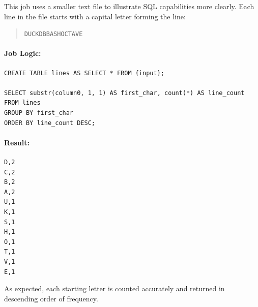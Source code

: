 This job uses a smaller text file to illustrate SQL capabilities more clearly. Each line in the file starts with a capital letter forming the line:

\begin{quote}
\texttt{DUCKDBBASHOCTAVE}
\end{quote}

\paragraph{Job Logic:}
\begin{verbatim}
CREATE TABLE lines AS SELECT * FROM {input};

SELECT substr(column0, 1, 1) AS first_char, count(*) AS line_count
FROM lines
GROUP BY first_char
ORDER BY line_count DESC;
\end{verbatim}

\paragraph{Result:}

\begin{verbatim}
D,2
C,2
B,2
A,2
U,1
K,1
S,1
H,1
O,1
T,1
V,1
E,1
\end{verbatim}

As expected, each starting letter is counted accurately and returned in descending order of frequency.

